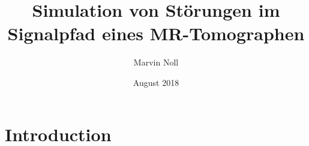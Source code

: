 \documentclass{article}
\title{Simulation von Störungen im Signalpfad eines MR-Tomographen}
\author{Marvin Noll}
\date{August 2018}
\begin{document}
\maketitle

\section{Introduction}
\end{document}
